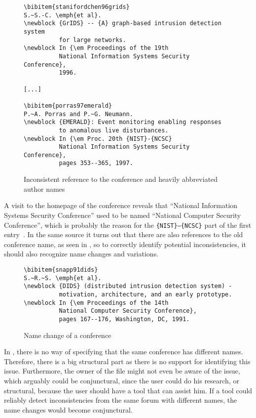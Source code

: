 \begin{figure}
  \centering
\begin{small}
\begin{verbatim}
\bibitem{stanifordchen96grids}
S.~S.-C. \emph{et al}.
\newblock {GrIDS} -- {A} graph-based intrusion detection system
          for large networks.
\newblock In {\em Proceedings of the 19th
          National Information Systems Security Conference},
          1996.

[...]

\bibitem{porras97emerald}
P.~A. Porras and P.~G. Neumann.
\newblock {EMERALD}: Event monitoring enabling responses
          to anomalous live disturbances.
\newblock In {\em Proc. 20th {NIST}-{NCSC}
          National Information Systems Security Conference},
          pages 353--365, 1997.

\end{verbatim}
\end{small}
  \caption{Inconsistent reference to the conference and heavily abbreviated author names}
\label{fig:entry_journal_name_authors}
\end{figure}

A visit to the homepage of the conference reveals that ``National
Information Systems Security Conference'' used to be named ``National
Computer Security Conference'', which is probably the reason for the
\texttt{\{NIST\}--\{NCSC\}} part of the first entry~\cite{nist2014_nissc}.  In
the same source it turns out that there are also references to the old
conference name, as seen in , so to
correctly identify potential inconsistencies, it should also recognize
name changes and variations.

\begin{figure}
  \centering
\begin{small}
\begin{verbatim}
\bibitem{snapp91dids}
S.~R.~S. \emph{et al}.
\newblock {DIDS} (distributed intrusion detection system) -
          motivation, architecture, and an early prototype.
\newblock In {\em Proceedings of the 14th
          National Computer Security Conference},
          pages 167--176, Washington, DC, 1991.
\end{verbatim}
\end{small}
  \caption{Name change of a conference}
\label{fig:conference_name}
\end{figure}

In {\bibtex}, there is no way of specifying that the same conference
has different names.  Therefore, there is a big structural part as
there is no support for identifying this issue.  Furthermore, the
owner of the {\bibtex} file might not even be aware of the issue,
which arguably could be conjunctural, since the user could do his
research, or structural, because the user should have a tool that can
assist him.  If a tool could reliably detect inconsistencies from the
same forum with different names, the name changes would become
conjunctural.


